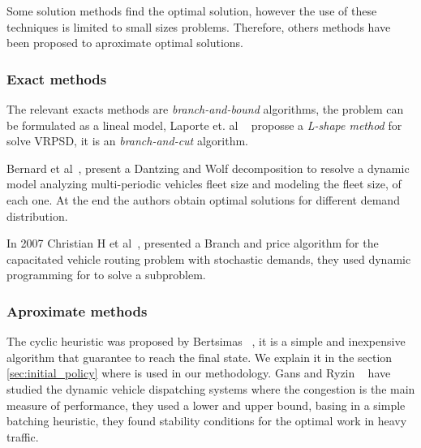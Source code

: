 Some solution methods find the optimal solution, however the use of these techniques is limited to small sizes problems. Therefore, others methods have been proposed to aproximate optimal solutions.



\subsubsection{Exact methods}

The relevant exacts methods are \textit{branch-and-bound} algorithms, the problem can be formulated as a lineal model, Laporte et. al ~\cite{laporte_integer_2002} proposse a \textit{L-shape method} for solve VRPSD, it is an \textit{branch-and-cut} algorithm.

Bernard et al~\cite{cheung_dynamic_2008},  present a Dantzing and Wolf decomposition to resolve a dynamic model analyzing multi-periodic vehicles fleet size and modeling the fleet size, of each one. At the end the authors obtain optimal solutions for different demand distribution.

In 2007 Christian H et al~\cite{christiansen_branch-and-price_2007}, presented a Branch and price algorithm for the capacitated vehicle routing problem with stochastic demands, they used dynamic programming for to solve a subproblem.

\subsubsection{Aproximate methods}

The cyclic heuristic was proposed by Bertsimas ~\cite{bertsimas_vehicle_1992}, it is a simple and inexpensive algorithm that guarantee to reach the final state. We explain it in the section \ref{sec:initial_policy} where is used in our methodology. Gans and Ryzin ~\cite{Gans_1999} have studied the dynamic vehicle dispatching systems where the congestion is the main measure of performance, they used a lower and upper bound, basing in a simple batching heuristic, they found stability conditions for the optimal work in heavy traffic.

